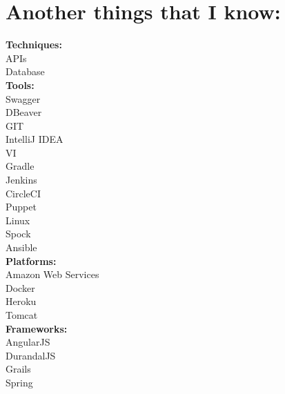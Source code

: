 \documentclass[]{friggeri-cv}
\begin{document}
\section{Another things that I know:}
\begin{multicols}{3}
    \textbf{Techniques:}\\
    APIs\\
    Database\\
    \textbf{Tools:}\\
    Swagger\\
    DBeaver\\
    GIT\\
    IntelliJ IDEA\\
    VI\\
    Gradle\\
    Jenkins\\
    CircleCI\\
    Puppet\\
    Linux\\
    Spock\\
    Ansible\\
    \textbf{Platforms:}\\
    Amazon Web Services\\
    Docker\\
    Heroku\\
    Tomcat\\
    \textbf{Frameworks:}\\
    AngularJS\\
    DurandalJS\\
    Grails\\
    Spring
\end{multicols}
\end{document}
